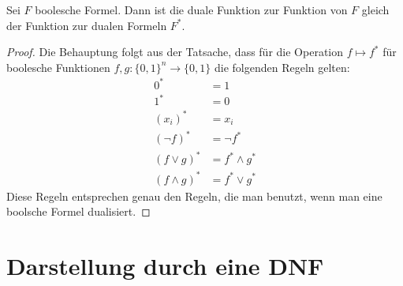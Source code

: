 \begin{thm}
	Sei $F$ boolesche Formel. Dann ist die duale Funktion zur Funktion von $F$ gleich der Funktion zur dualen Formeln $F^\ast$. 
\end{thm}
\begin{proof} 
	Die Behauptung folgt aus der Tatsache, dass für die Operation $f \mapsto f^\ast$ für boolesche Funktionen $f,g : \{0,1\}^n \to \{0,1\}$ die folgenden Regeln gelten: 
	\begin{align*}
		0^\ast & = 1
		\\ 1^\ast & = 0
		\\ (x_i)^\ast & = x_i
		\\ (\neg{f})^\ast & = \neg{f^\ast}
		\\ (f \vee g)^\ast & = f ^\ast\wedge g^\ast
		\\ (f \wedge g)^\ast & = f ^\ast\vee g^\ast
	\end{align*} 
	Diese Regeln entsprechen genau den Regeln, die man benutzt, wenn man eine boolsche Formel dualisiert. 
\end{proof} 



\section{Darstellung durch eine DNF}


